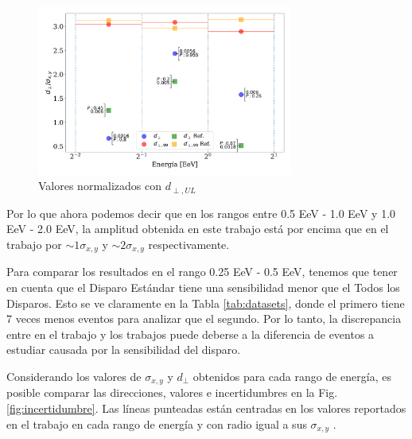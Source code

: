    \begin{figure}[H]
        \begin{small}
            \begin{center}
                \includegraphics[width=0.75\textwidth]{d_perp_normalizado_sigmas_v5.pdf}
            \end{center}
            \caption{Valores normalizados con $d_{\perp,UL}$}
            \label{fig:normalizado_sigma}
        \end{small}
    \end{figure}

Por lo que ahora podemos decir que en los rangos entre 0.5 EeV - 1.0 EeV y 1.0 EeV - 2.0 EeV, la amplitud obtenida en este trabajo está por encima que en el trabajo \cite{Aab_2020} por $\sim 1\sigma_{x,y}$ y $\sim 2 \sigma_{x,y}$ respectivamente.

Para comparar los resultados en el  rango 0.25 EeV - 0.5 EeV, tenemos que tener en cuenta que el Disparo Estándar tiene una sensibilidad menor que el Todos los Disparos. Esto se ve claramente en la Tabla \ref{tab:datasets}, donde el primero tiene 7 veces menos eventos para analizar que el segundo. Por lo tanto, la discrepancia entre en el trabajo \cite{Aab_2020} y los trabajos puede deberse a la  diferencia de eventos a estudiar causada por la sensibilidad del disparo.


Considerando los valores de $\sigma_{x,y}$ y $d_\perp$ obtenidos para cada rango de energía, es posible  comparar las direcciones, valores e incertidumbres en la Fig.\ref{fig:incertidumbre}. Las líneas punteadas están centradas en los valores reportados en el trabajo \cite{Aab_2020} en cada rango de energía y con radio igual a sus $\sigma_{x,y}$ . 

